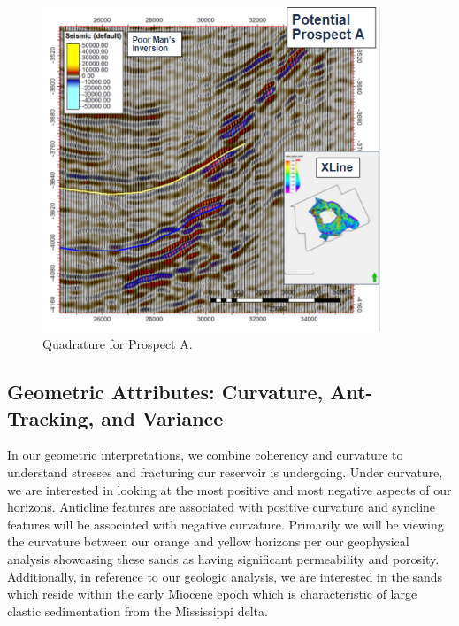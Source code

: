 \documentclass[fleqn]{article}
\begin{document}
\begin{figure}[H]
    \centering
    \includegraphics[width=0.9\textwidth]{Images/poor_mans.PNG}
    \caption{Quadrature for Prospect A.}
    \label{fig:Quad}
\end{figure}

\subsection{Geometric Attributes: Curvature, Ant-Tracking, and Variance}

In our geometric interpretations, we combine coherency and curvature to understand stresses and fracturing our reservoir is undergoing. Under curvature, we are interested in looking at the most positive and most negative aspects of our horizons. Anticline features are associated with positive curvature and syncline features will be associated with negative curvature. Primarily we will be viewing the curvature between our orange and yellow horizons per our geophysical analysis showcasing these sands as having significant permeability and porosity. Additionally, in reference to our geologic analysis, we are interested in the sands which reside within the early Miocene epoch which is characteristic of large clastic sedimentation from the Mississippi delta.
\end{document}
